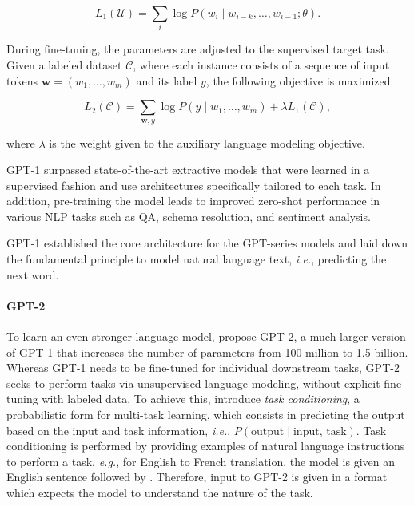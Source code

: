 \begin{equation}
    L_1(\mathcal{U}) = \sum_i \log P(w_i \mid w_{i-k}, \ldots, w_{i-1}; \theta).
\end{equation}

During fine-tuning, the parameters are adjusted to the supervised target task. Given a labeled dataset $\mathcal{C}$, where each instance consists of a sequence of input tokens $\bm{w} = (w_1, \ldots, w_m)$ and its label $y$, the following objective is maximized:

\begin{equation}
    L_2(\mathcal{C}) = \sum_{\bm{w}, y} \log P(y \mid w_1, \ldots, w_m) + \lambda L_1(\mathcal{C}),
\end{equation}

where $\lambda$ is the weight given to the auxiliary language modeling objective.

\ac{GPT}-1 surpassed state-of-the-art extractive models that were learned in a supervised fashion and use architectures specifically tailored to each task. In addition, pre-training the model leads to improved zero-shot performance in various \ac{NLP} tasks such as \ac{QA}, schema resolution, and sentiment analysis.

\ac{GPT}-1 established the core architecture for the \ac{GPT}-series models and laid down the fundamental principle to model natural language text, \textit{i.e.}, predicting the next word.


\paragraph{GPT-2}

To learn an even stronger language model, \citet{radford2019language} propose \ac{GPT}-2, a much larger version of \ac{GPT}-1 that increases the number of parameters from 100 million to 1.5 billion. Whereas \ac{GPT}-1 needs to be fine-tuned for individual downstream tasks, \ac{GPT}-2 seeks to perform tasks via unsupervised language modeling, without explicit fine-tuning with labeled data. To achieve this, \citet{radford2019language} introduce \textit{task conditioning}, a probabilistic form for multi-task learning, which consists in predicting the output based on the input and task information, \textit{i.e.}, $P(\text{output} \mid \text{input, task})$. Task conditioning is performed by providing examples of natural language instructions to perform a task, \textit{e.g.}, for English to French translation, the model is given an English sentence followed by . Therefore, input to \ac{GPT}-2 is given in a format which expects the model to understand the nature of the task. %


